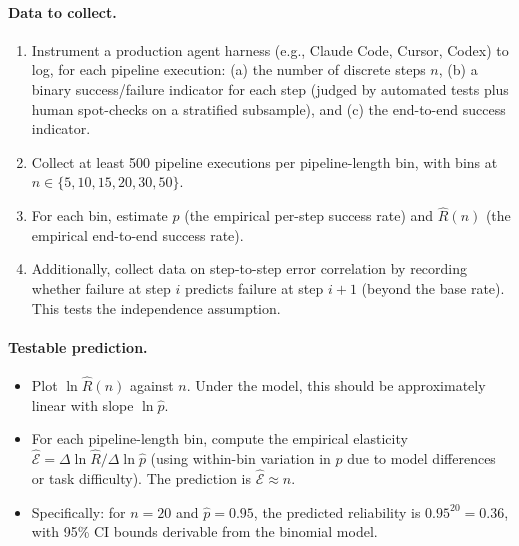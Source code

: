 \documentclass[11pt, a4paper]{googledeepmind}
\begin{document}
\paragraph{Data to collect.}
\begin{enumerate}[nosep]
    \item Instrument a production agent harness (e.g., Claude Code, Cursor, Codex) to log, for each pipeline execution: (a) the number of discrete steps $n$, (b) a binary success/failure indicator for each step (judged by automated tests plus human spot-checks on a stratified subsample), and (c) the end-to-end success indicator.
    \item Collect at least 500 pipeline executions per pipeline-length bin, with bins at $n \in \{5, 10, 15, 20, 30, 50\}$.
    \item For each bin, estimate $\hat{p}$ (the empirical per-step success rate) and $\hat{R}(n)$ (the empirical end-to-end success rate).
    \item Additionally, collect data on step-to-step error correlation by recording whether failure at step $i$ predicts failure at step $i+1$ (beyond the base rate). This tests the independence assumption.
\end{enumerate}

\paragraph{Testable prediction.}
\begin{itemize}[nosep]
    \item Plot $\ln \hat{R}(n)$ against $n$. Under the model, this should be approximately linear with slope $\ln \hat{p}$.
    \item For each pipeline-length bin, compute the empirical elasticity $\hat{\mathcal{E}} = \Delta \ln \hat{R} / \Delta \ln \hat{p}$ (using within-bin variation in $p$ due to model differences or task difficulty). The prediction is $\hat{\mathcal{E}} \approx n$.
    \item Specifically: for $n = 20$ and $\hat{p} = 0.95$, the predicted reliability is $0.95^{20} = 0.36$, with 95\% CI bounds derivable from the binomial model.
\end{itemize}
\end{document}
